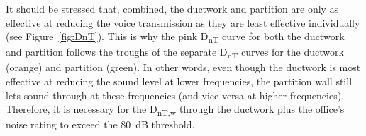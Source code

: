 It should be stressed that, combined, the ductwork and partition are only as effective at reducing the voice transmission as they are least effective individually (see Figure~\ref{fig:DnT}).
This is why the pink D\textsubscript{nT} curve for both the ductwork and partition follows the troughs of the separate D\textsubscript{nT} curves for the ductwork (orange) and partition (green).
In other words, even though the ductwork is most effective at reducing the sound level at lower frequencies, the partition wall still lets sound through at these frequencies (and vice-versa at higher frequencies).
Therefore, it is necessary for the D\textsubscript{nT,w} through the ductwork plus the office's noise rating to exceed the 80~dB threshold.


	
		


